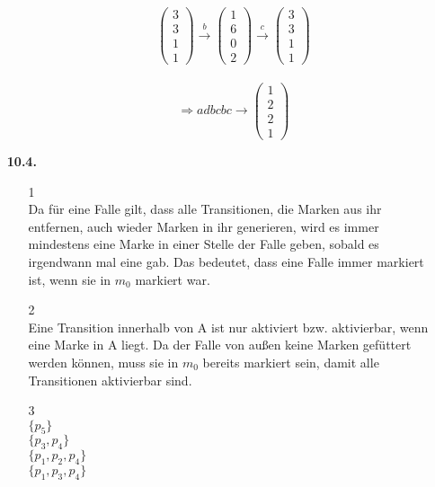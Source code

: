 \documentclass[a4paper,11pt,fleqn]{scrartcl}
\begin{document}
\begin{enumerate}
\begin{enumerate}
\[        		\begin{pmatrix}
        			3 \\ 3 \\ 1 \\ 1
        		\end{pmatrix} \overset{b}{\rightarrow}
        		\begin{pmatrix}
        			1 \\ 6 \\ 0 \\ 2
        		\end{pmatrix} \overset{c}{\rightarrow}
        		\begin{pmatrix}
        			3 \\ 3 \\ 1 \\ 1
        		\end{pmatrix}
				\] \\
				\[
				\Rightarrow adbcbc \rightarrow
				\begin{pmatrix}
					1 \\ 2 \\ 2 \\ 1
				\end{pmatrix}
				\]
		\end{enumerate}
		\item[\textbf{10.4.}]
		\begin{enumerate}
			\item[1] \quad \\
    			Da für eine Falle gilt, dass alle Transitionen, die Marken aus ihr entfernen, auch wieder Marken in ihr generieren,
                wird es immer mindestens eine Marke in einer Stelle der Falle geben, sobald es irgendwann mal eine gab.
                Das bedeutet, dass eine Falle immer markiert ist, wenn sie in $m_0$ markiert war.
			\item[2] \quad \\
                Eine Transition innerhalb von A ist nur aktiviert bzw. aktivierbar, wenn eine Marke in A liegt. Da der Falle von außen keine Marken gefüttert werden können, muss sie in $m_0$ bereits markiert sein, damit alle Transitionen aktivierbar sind.
			\item[3] \quad \\
                $\{p_5\}$ \\
                $\{p_3,p_4\}$ \\
                $\{p_1,p_2,p_4\}$ \\
                $\{p_1,p_3,p_4\}$ \\

\end{enumerate}
\end{enumerate}
\end{document}

